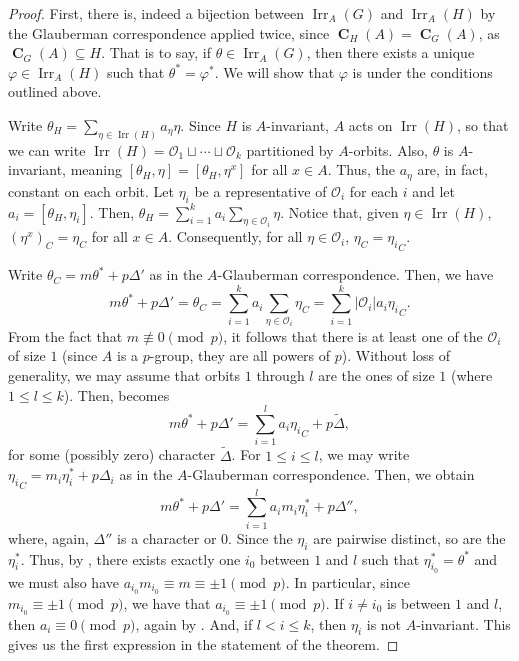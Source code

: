 \documentclass[10pt,a4paper]{amsart}
\DeclareMathOperator{\CB}{\mathbf{C}}
\DeclareMathOperator{\Irr}{Irr}
\begin{document}
\begin{proof}
	First, there is, indeed a bijection between $\Irr_{A}(G)$ and $\Irr_{A}(H)$ by the Glauberman correspondence applied twice, since $\CB_H(A) = \CB_G(A)$, as $\CB_G(A) \subseteq H$. That is to say, if $\theta \in \Irr_{A}(G)$, then there exists a unique $\varphi \in \Irr_{A}(H)$ such that $\theta^* = \varphi^*$. We will show that $\varphi$ is under the conditions outlined above.
	
	Write $\theta_H = \sum_{\eta \in \Irr(H)} a_\eta \eta$. Since $H$ is $A$-invariant, $A$ acts on $\Irr(H)$, so that we can write $\Irr(H) = \mathcal{O}_1 \sqcup \cdots \sqcup \mathcal{O}_k$ partitioned by $A$-orbits. Also, $\theta$ is $A$-invariant, meaning $[\theta_H, \eta] = [\theta_H, \eta^x]$ for all $x \in A$. Thus, the $a_\eta$ are, in fact, constant on each orbit. Let $\eta_i$ be a representative of $\mathcal{O}_i$ for each $i$ and let $a_i = [\theta_H, \eta_i]$. Then, $\theta_H = \sum_{i = 1}^k a_i \sum_{\eta \in \mathcal{O}_i} \eta$. Notice that, given $\eta \in \Irr(H)$, $(\eta^x)_{C} = \eta_{C}$ for all $x \in A$. Consequently, for all $\eta \in \mathcal{O}_i$, $\eta_{C} = {\eta_i}_{C}$.
	
	Write $\theta_{C} = m\theta^* + p\Delta'$ as in the $A$-Glauberman correspondence. Then, we have
	\begin{equation}
		\label{eq1}
		m\theta^* + p\Delta' = \theta_{C} = \sum_{i = 1}^k a_i \sum_{\eta \in \mathcal{O}_i} \eta_{C} = \sum_{i = 1}^k |\mathcal{O}_i| a_i {\eta_i}_{C}.
	\end{equation}
	From the fact that $m \not \equiv 0 \pmod{p}$, it follows that there is at least one of the $\mathcal{O}_i$ of size $1$ (since $A$ is a $p$-group, they are all powers of $p$). Without loss of generality, we may assume that orbits $1$ through $l$ are the ones of size $1$ (where $1 \leq l \leq k$). Then,  becomes
	\begin{equation*}
		m\theta^* + p\Delta' = \sum_{i = 1}^l a_i {\eta_i}_{C} + p \tilde{\Delta},
	\end{equation*}
	for some (possibly zero) character $\tilde{\Delta}$. For $1 \leq i \leq l$, we may write ${\eta_i}_{C} = m_i\eta_i^* + p\Delta_i$ as in the $A$-Glauberman correspondence. Then, we obtain
	\begin{equation}
		\label{eq2}
		m\theta^* + p\Delta' = \sum_{i = 1}^l a_i m_i\eta_i^*+ p \Delta'',
	\end{equation}
	where, again, $\Delta''$ is a character or $0$. Since the $\eta_i$ are pairwise distinct, so are the $\eta_i^*$. Thus, by , there exists exactly one $i_0$ between $1$ and $l$ such that $\eta_{i_0}^* = \theta^*$ and we must also have $a_{i_0} m_{i_0} \equiv m \equiv \pm 1 \pmod{p}$. In particular, since $m_{i_0} \equiv \pm 1 \pmod{p}$, we have that $a_{i_0} \equiv \pm 1 \pmod{p}$. If $i \neq i_0$ is between $1$ and $l$, then $a_i \equiv 0 \pmod{p}$, again by . And, if $l < i \leq k$, then $\eta_i$ is not $A$-invariant. This gives us the first expression in the statement of the theorem.
	

\end{proof}
\end{document}
